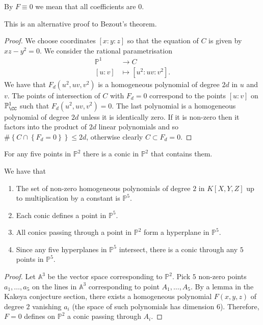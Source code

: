 \documentclass[12pt, a4paper]{article}
\renewcommand{\AA}{\mathbb A}
\newcommand{\PP}{\mathbb P}
\begin{document}
\begin{mdremark}
    By \(F \equiv 0\) we mean that all coefficients are \(0\).
\end{mdremark}

\begin{mdnote}
    This is an alternative proof to Bezout's theorem.
\end{mdnote}

\begin{proof}
    We choose coordinates \([x:y:z]\) so that the equation of \(C\) is given by \(xz-y^2=0\). We consider the rational parametrisation 
    \[\begin{aligned}
        \PP^1 &\to C \\
        [u:v] &\mapsto [u^2:uv:v^2].
    \end{aligned}\]
    We have that \(F_d(u^2,uv,v^2)\) is a homogeneous polynomial of degree \(2d\) in \(u\) and \(v\). The points of intersection of \(C\) with \(F_d=0\) correspond to the points \([u:v] \) on \(\PP^1_\CC\) such that \(F_d(u^2,uv,v^2)=0\). The last polynomial is a homogeneous polynomial of degree \(2d\) unless it is identically zero. If it is non-zero then it factors into the product of \(2d\) linear polynomials and so \(\#\left\{ C \cap \left\{ F_d=0 \right\} \right\} \leq 2d\), otherwise clearly \(C \subset F_d  =0\).
\end{proof}

\begin{mdlemma}
    For any five points in \(\PP^2\) there is a conic in \(\PP^2\) that contains them.
\end{mdlemma}

\begin{mdremark}
    We have that
    \begin{enumerate}
        \item The set of non-zero homogeneous polynomials of degree \(2\) in \(K[X,Y,Z]\) up to multiplication by a constant is \(\PP^5\).
        \item Each conic defines a point in \(\PP^5\).
        \item All conics passing through a point in \(\PP^2\) form a hyperplane in \(\PP^5\).
        \item Since any five hyperplanes in \(\PP^5\) intersect, there is a conic through any \(5\) points in \(\PP^5\).
    \end{enumerate}
\end{mdremark}

\begin{proof}
    Let \(\AA^3\) be the vector space corresponding to \(\PP^2\). Pick \(5\) non-zero points \(a_1,\ldots,a_5\) on the lines in \(\AA^3\) corresponding to point \(A_1,\ldots,A_5\). By a lemma in the Kakeya conjecture section, there exists a homogeneous polynomial \(F(x,y,z)\) of degree \(2\) vanishing \(a_i\) (the space of such polynomials has dimension \(6\)). Therefore, \(F=0\) defines on \(\PP^2\) a conic passing through \(A_i\).
\end{proof}
\end{document}
